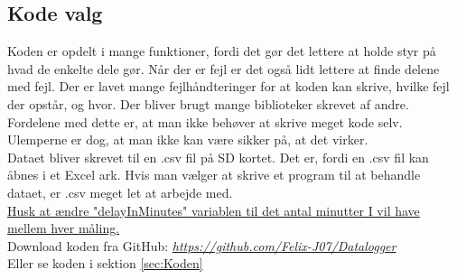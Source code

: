	\subsection{Kode valg}
		Koden er opdelt i mange funktioner, fordi det gør det lettere at holde styr på hvad de enkelte dele gør. Når der er fejl er det også lidt lettere at finde delene med fejl. Der er lavet mange fejlhåndteringer for at koden kan skrive, hvilke fejl der opstår, og hvor. Der bliver brugt mange biblioteker skrevet af andre. Fordelene med dette er, at man ikke behøver at skrive meget kode selv. Ulemperne er dog, at man ikke kan være sikker på, at det virker. \\ [7pt]
		Dataet bliver skrevet til en .csv fil på SD kortet. Det er, fordi en .csv fil kan åbnes i et Excel ark. Hvis man vælger at skrive et program til at behandle dataet, er .csv meget let at arbejde med.\\ [15pt]
		\underline{Husk at ændre "delayInMinutes"{} variablen til det antal minutter I vil have mellem hver måling.}\\ [7pt]
		Download koden fra GitHub: \textit{\url{https://github.com/Felix-J07/Datalogger}}\\
		Eller se koden i sektion \ref{sec:Koden}